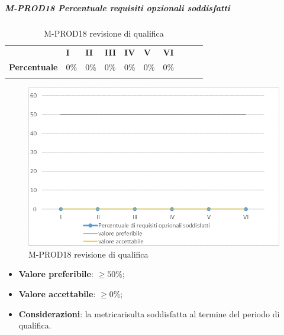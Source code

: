 \subparagraph{M-PROD18 Percentuale requisiti opzionali soddisfatti} \mbox{}
\begin{longtable}[H!] {						
		>{}p{50mm}  		
		>{}p{8mm}
		>{}p{8mm}		
		>{}p{8mm}		
		>{}p{8mm}		
		>{}p{8mm}		
		>{}p{8mm}
		>{}p{8mm}
		>{}p{8mm}
		>{}p{8mm}
	}
	\rowcolor{gray!50}
	\textbf{} & \textbf{I} & \textbf{II} & \textbf{III} & \textbf{IV} & \textbf{V} & \textbf{VI} \TBstrut \\ [2mm]
	\textbf{Percentuale} & 0\% & 0\% & 0\% & 0\% & 0\% & 0\% \TBstrut \\ [2mm]
	\rowcolor{white}
	\caption{M-PROD18 revisione di qualifica}
\end{longtable}
\begin{figure}[H] 	
	\includegraphics[width=\linewidth]{./img/grafici/RQ18.png}	
	\caption{M-PROD18 revisione di qualifica}	
\end{figure}
\begin{itemize}
	\item \textbf{Valore preferibile}: $\ge 50\%$;
	\item \textbf{Valore accettabile}: $\ge 0\%$;
	\item \textbf{Considerazioni}: la metrica\glosp risulta soddisfatta al termine del periodo di qualifica.
\end{itemize}

